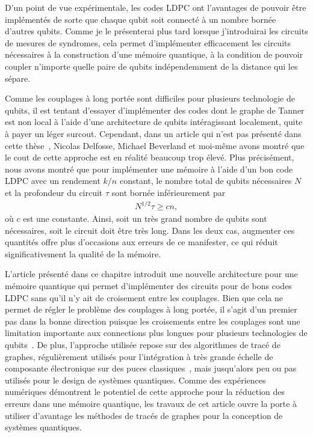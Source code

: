 D'un point de vue expérimentale,
les codes LDPC ont l'avantages de pouvoir être implémentés de sorte que 
chaque qubit soit connecté à un nombre bornée d'autres qubits.
Comme je le présenterai plus tard lorsque j'introduirai les circuits
de mesures de syndromes,
cela permet d'implémenter efficacement les circuits nécessaires à la
construction d'une mémoire quantique,
à la condition de pouvoir coupler n'importe quelle paire de qubits 
indépendemment de la distance qui les sépare.

Comme les couplages à long portée sont difficiles pour plusieurs technologie de qubits,
il est tentant d'essayer d'implémenter des codes dont le graphe de Tanner est non local
à l'aide d'une architecture de qubits intéragissant localement,
quite à payer un léger surcout.
Cependant,
dans un article qui n'est pas présenté dans cette thèse~\cite{delfosse_bounds_2021},
Nicolas Delfosse, Michael Beverland et moi-même avons montré que le cout de cette approche
est en réalité beaucoup trop élevé.
Plus précisément,
nous avons montré que pour implémenter une mémoire à l'aide d'un bon code LDPC
avec un rendement $k/n$ constant,
le nombre total de qubits nécessaires $N$ et la profondeur du circuit $\tau$ sont 
bornée inférieurement par 
\begin{align}
	N^{1/2} \tau \geq c n,
\end{align}
où $c$ est une constante.
Ainsi,
soit un très grand nombre de qubits sont nécessaires,
soit le circuit doit être très long.
Dans les deux cas,
augmenter ces quantités offre plus d'occasions aux erreurs de ce manifester,
ce qui réduit significativement la qualité de la mémoire.

L'article présenté dans ce chapitre introduit une nouvelle architecture pour une mémoire quantique
qui permet d'implémenter des circuits pour de bons codes LDPC sans qu'il n'y ait de
croisement entre les couplages.
Bien que cela ne permet de régler le problème des couplages à long portée,
il s'agit d'un premier pas dans la bonne direction puisque les croisements
entre les couplages sont une limitation importante aux connections plus longues
pour plusieurs technologies de
qubits~\cite{sarovar_detecting_2020, debnath_demonstration_2016, neill_blueprint_2018, ash-saki_analysis_2020}.
De plus,
l'approche utilisée repose sur des algorithmes de tracé de graphes,
régulièrement utilisés pour l'intégration à très grande échelle de composante électronique
sur des puces classiques~\cite{leighton_complexity_1983},
mais jusqu'alors peu ou pas utilisés pour le design de systèmes quantiques.
Comme des expériences numériques démontrent le potentiel de cette approche pour la réduction
des erreurs dans une mémoire quantique,
les travaux de cet article ouvre la porte à utiliser d'avantage les méthodes 
de tracés de graphes pour la conception de systèmes quantiques.

